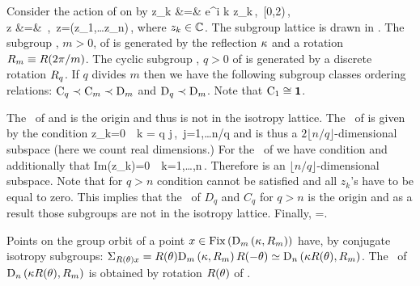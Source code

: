 \begin{example}\label{O2iso} %
 Consider the action of  on  by
 \bea
	\Rot{\theta} z_k &=& e^{i k \theta} z_k\,,\ \theta\in[0,2\pi)\,,\label{eq:SO2stndrd} \\
	\Refl z &=& \,,\  z=(z_1,\ldots z_n)\,,
	\label{eq:O2stndrd}
 \eea
where $z_k\in\mathbb{C}^{}$. The subgroup lattice is drawn in . The subgroup
, $m>0$, of  is generated by the reflection $\kappa$ and a rotation $R_{m}\equiv R(2\pi/m)$.
The cyclic subgroup , $q>0$ of  is generated by a discrete rotation $R_{q}$.
If $q$ divides $m$ then we have the following subgroup classes ordering relations: $\mathrm{C}_{q}\prec\mathrm{C}_{m}\prec\mathrm{D}_{m}$
and $\mathrm{D}_{q}\prec\mathrm{D}_{m}$. Note that $\mathrm{C}_{1}\cong\mathbf{1}$.

The \fixedsp\ of  and  is the origin and thus  is not in the isotropy lattice.
The \fixedsp\ of  is given by the condition
\beq
	z_k=0\ \ k = q j\,,\ j=1,\ldots\lfloor n/q \rfloor
	\label{eq:O2CqFix}
\eeq
and is thus a $2 \lfloor n/q\rfloor$-dimensional subspace (here we count real dimensions.)
For the \fixedsp\ of  we have condition  and additionally that
\beq
	Im(z_k)=0\ \ k=1,\ldots,n\,.
\eeq
Therefore  is an $ \lfloor n/q\rfloor$-dimensional subspace. Note that for $q>n$ condition
 cannot be satisfied and all $z_k$'s have to be equal to zero. This implies that the \fixedsp\ of $D_q$ and $C_q$ for $q>n$ is the origin and as a result those subgroups are not in the isotropy lattice. Finally, \Fix{\Idg}=.

Points on the group orbit of a point  $x\in\mathrm{Fix}\left(\mathrm{D}_{m}\left(\kappa,R_{m}\right)\right)$ have, by  conjugate
isotropy subgroups: $\Sigma_{R(\theta)x}=R(\theta)\mathrm{D}_{m}\left(\kappa,R_{m}\right)R(-\theta)\simeq\mathrm{D}_{n}\left(\kappa R(\theta),R_{m}\right)$. The \fixedsp\ of $\mathrm{D}_{n}\left(\kappa R(\theta),R_{m}\right)$ is obtained by rotation $R(\theta)$ of .





\end{example}
